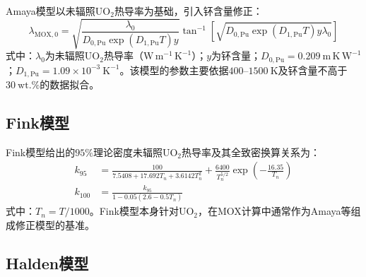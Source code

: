 Amaya模型以未辐照$\mathrm{UO}_2$热导率为基础，引入钚含量修正：
\begin{equation}
	\lambda_{\mathrm{MOX},0}
	=\sqrt{
		\frac{\lambda_0}
		{D_{0,\mathrm{Pu}}\exp(D_{1,\mathrm{Pu}}T)y}}
	\tan^{-1}\!\left[
	\sqrt{D_{0,\mathrm{Pu}}\exp(D_{1,\mathrm{Pu}}T)y\lambda_0}
	\right]
	\label{eq:appendix_amaya_thermal_conductivity}
\end{equation}
\noindent 式中：$\lambda_0$为未辐照$\mathrm{UO}_2$热导率（$\mathrm{W\,m^{-1}\,K^{-1}}$）；$y$为钚含量；$D_{0,\mathrm{Pu}}=0.209\ \mathrm{m\,K\,W^{-1}}$；$D_{1,\mathrm{Pu}}=1.09\times10^{-3}\ \mathrm{K^{-1}}$。该模型的参数主要依据$400$--$1500\ \mathrm{K}$及钚含量不高于$30\ \mathrm{wt.\%}$的数据拟合。

\subsection{Fink模型}

Fink模型给出的$95\%$理论密度未辐照$\mathrm{UO}_2$热导率及其全致密换算关系为：
\begin{equation}
	\begin{aligned}
		k_{95}
		&=
		\frac{100}{7.5408+17.692T_n+3.6142T_n^2}
		+\frac{6400}{T_n^{5/2}}
		\exp\!\left(-\frac{16.35}{T_n}\right)\\
		k_{100}
		&=
		\frac{k_{95}}
		{1-0.05\left(2.6-0.5T_n\right)}
	\end{aligned}
	\label{eq:appendix_fink_k95}
\end{equation}
\label{eq:appendix_fink_k100}
\noindent 式中：$T_n=T/1000$。Fink模型本身针对$\mathrm{UO}_2$，在MOX计算中通常作为Amaya等组成修正模型的基准。

\subsection{Halden模型}

